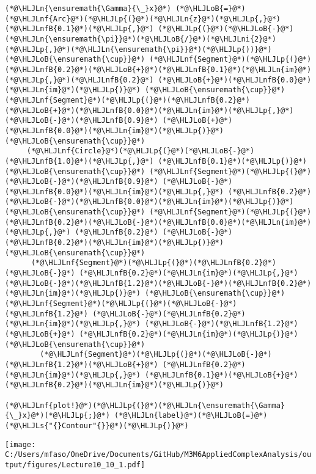\documentclass[12pt,a4paper]{article}
\newcommand{\HLJLn}[1]{#1}
\newcommand{\HLJLnf}[1]{\textcolor[RGB]{66,102,213}{#1}}
\newcommand{\HLJLs}[1]{\textcolor[RGB]{201,61,57}{#1}}
\newcommand{\HLJLnfB}[1]{\textcolor[RGB]{59,151,46}{#1}}
\newcommand{\HLJLni}[1]{\textcolor[RGB]{59,151,46}{#1}}
\newcommand{\HLJLoB}[1]{\textcolor[RGB]{102,102,102}{\textbf{#1}}}
\newcommand{\HLJLp}[1]{#1}
\begin{document}
\begin{lstlisting}
(*@\HLJLn{\ensuremath{\Gamma}{\_}x}@*) (*@\HLJLoB{=}@*)  (*@\HLJLnf{Arc}@*)(*@\HLJLp{(}@*)(*@\HLJLn{z}@*)(*@\HLJLp{,}@*) (*@\HLJLnfB{0.1}@*)(*@\HLJLp{,}@*) (*@\HLJLp{(}@*)(*@\HLJLoB{-}@*)(*@\HLJLn{\ensuremath{\pi}}@*)(*@\HLJLoB{/}@*)(*@\HLJLni{2}@*)(*@\HLJLp{,}@*)(*@\HLJLn{\ensuremath{\pi}}@*)(*@\HLJLp{))}@*) (*@\HLJLoB{\ensuremath{\cup}}@*) (*@\HLJLnf{Segment}@*)(*@\HLJLp{(}@*)(*@\HLJLnfB{0.2}@*)(*@\HLJLoB{+}@*)(*@\HLJLnfB{0.1}@*)(*@\HLJLn{im}@*)(*@\HLJLp{,}@*)(*@\HLJLnfB{0.2}@*) (*@\HLJLoB{+}@*)(*@\HLJLnfB{0.0}@*)(*@\HLJLn{im}@*)(*@\HLJLp{)}@*) (*@\HLJLoB{\ensuremath{\cup}}@*) (*@\HLJLnf{Segment}@*)(*@\HLJLp{(}@*)(*@\HLJLnfB{0.2}@*)  (*@\HLJLoB{+}@*)(*@\HLJLnfB{0.0}@*)(*@\HLJLn{im}@*)(*@\HLJLp{,}@*) (*@\HLJLoB{-}@*)(*@\HLJLnfB{0.9}@*) (*@\HLJLoB{+}@*)(*@\HLJLnfB{0.0}@*)(*@\HLJLn{im}@*)(*@\HLJLp{)}@*) (*@\HLJLoB{\ensuremath{\cup}}@*)
     (*@\HLJLnf{Circle}@*)(*@\HLJLp{(}@*)(*@\HLJLoB{-}@*)(*@\HLJLnfB{1.0}@*)(*@\HLJLp{,}@*) (*@\HLJLnfB{0.1}@*)(*@\HLJLp{)}@*) (*@\HLJLoB{\ensuremath{\cup}}@*) (*@\HLJLnf{Segment}@*)(*@\HLJLp{(}@*)(*@\HLJLoB{-}@*)(*@\HLJLnfB{0.9}@*) (*@\HLJLoB{-}@*)(*@\HLJLnfB{0.0}@*)(*@\HLJLn{im}@*)(*@\HLJLp{,}@*) (*@\HLJLnfB{0.2}@*)  (*@\HLJLoB{-}@*)(*@\HLJLnfB{0.0}@*)(*@\HLJLn{im}@*)(*@\HLJLp{)}@*) (*@\HLJLoB{\ensuremath{\cup}}@*) (*@\HLJLnf{Segment}@*)(*@\HLJLp{(}@*)(*@\HLJLnfB{0.2}@*)(*@\HLJLoB{-}@*)(*@\HLJLnfB{0.0}@*)(*@\HLJLn{im}@*)(*@\HLJLp{,}@*) (*@\HLJLnfB{0.2}@*) (*@\HLJLoB{-}@*) (*@\HLJLnfB{0.2}@*)(*@\HLJLn{im}@*)(*@\HLJLp{)}@*) (*@\HLJLoB{\ensuremath{\cup}}@*)
      (*@\HLJLnf{Segment}@*)(*@\HLJLp{(}@*)(*@\HLJLnfB{0.2}@*) (*@\HLJLoB{-}@*) (*@\HLJLnfB{0.2}@*)(*@\HLJLn{im}@*)(*@\HLJLp{,}@*) (*@\HLJLoB{-}@*)(*@\HLJLnfB{1.2}@*)(*@\HLJLoB{-}@*)(*@\HLJLnfB{0.2}@*)(*@\HLJLn{im}@*)(*@\HLJLp{)}@*) (*@\HLJLoB{\ensuremath{\cup}}@*) (*@\HLJLnf{Segment}@*)(*@\HLJLp{(}@*)(*@\HLJLoB{-}@*)(*@\HLJLnfB{1.2}@*) (*@\HLJLoB{-}@*)(*@\HLJLnfB{0.2}@*)(*@\HLJLn{im}@*)(*@\HLJLp{,}@*) (*@\HLJLoB{-}@*)(*@\HLJLnfB{1.2}@*)(*@\HLJLoB{+}@*) (*@\HLJLnfB{0.2}@*)(*@\HLJLn{im}@*)(*@\HLJLp{)}@*) (*@\HLJLoB{\ensuremath{\cup}}@*)
        (*@\HLJLnf{Segment}@*)(*@\HLJLp{(}@*)(*@\HLJLoB{-}@*)(*@\HLJLnfB{1.2}@*)(*@\HLJLoB{+}@*) (*@\HLJLnfB{0.2}@*)(*@\HLJLn{im}@*)(*@\HLJLp{,}@*) (*@\HLJLnfB{0.1}@*)(*@\HLJLoB{+}@*)(*@\HLJLnfB{0.2}@*)(*@\HLJLn{im}@*)(*@\HLJLp{)}@*)

(*@\HLJLnf{plot!}@*)(*@\HLJLp{(}@*)(*@\HLJLn{\ensuremath{\Gamma}{\_}x}@*)(*@\HLJLp{;}@*) (*@\HLJLn{label}@*)(*@\HLJLoB{=}@*)(*@\HLJLs{"{}Contour"{}}@*)(*@\HLJLp{)}@*)
\end{lstlisting}

\texttt{[image: C:/Users/mfaso/OneDrive/Documents/GitHub/M3M6AppliedComplexAnalysis/output/figures/Lecture10\_10\_1.pdf]}
\end{document}

